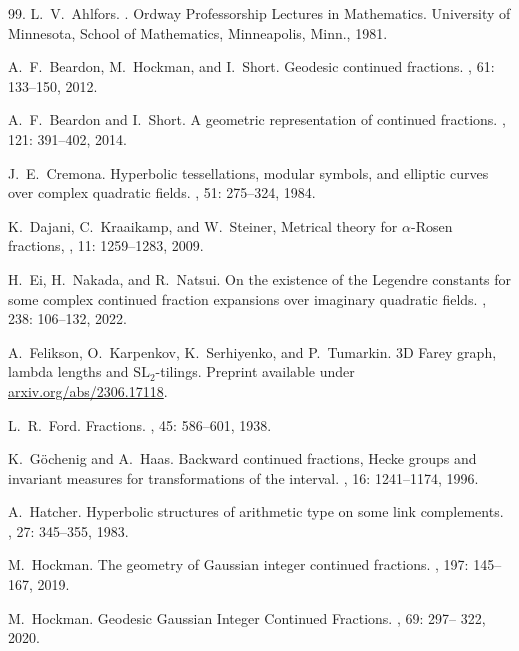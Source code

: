 \documentclass[graybox]{svmult}
\begin{document}
\begin{thebibliography}{99.}
L.~V.~Ahlfors.
.
\newblock Ordway Professorship Lectures in Mathematics. University of Minnesota, School of Mathematics, Minneapolis, Minn., 1981.

A.~F.~Beardon, M.~Hockman, and I.~Short.
\newblock Geodesic continued fractions.
, 61: 133--150, 2012.

A.~F.~Beardon and I.~Short.
\newblock A geometric representation of continued fractions.
, 121: 391--402, 2014. 

J.~E.~Cremona.
\newblock Hyperbolic tessellations, modular symbols, and elliptic curves over complex quadratic fields. 
, 51: 275--324, 1984.

K.~Dajani, C.~Kraaikamp, and W.~Steiner, 
\newblock Metrical theory for $\alpha$-Rosen fractions, 
, 11: 1259–1283, 2009.  

H.~Ei, H.~Nakada, and R.~Natsui. 
\newblock On the existence of the Legendre constants for some complex continued fraction expansions over imaginary quadratic fields. 
, 238: 106--132, 2022.

A.~Felikson, O.~Karpenkov, K.~Serhiyenko, and P.~Tumarkin.
3D Farey graph, lambda lengths and $\mathrm{SL}_2$-tilings.
Preprint available under \url{arxiv.org/abs/2306.17118}.

L.~R.~Ford.
\newblock  Fractions.
, 45: 586--601, 1938. 

K.~G\"ochenig and A.~Haas. 
\newblock Backward continued fractions, Hecke groups and invariant measures for transformations of the interval.
, 16: 1241--1174, 1996.

A.~Hatcher.
\newblock Hyperbolic structures of arithmetic type on some link complements.
, 27: 345–355, 1983.


M.~Hockman.
\newblock The geometry of Gaussian integer continued fractions.
, 197: 145--167, 2019.  

M.~Hockman.
\newblock Geodesic Gaussian Integer Continued Fractions. 
, 69: 297-- 322, 2020. 


\end{thebibliography}
\end{document}
